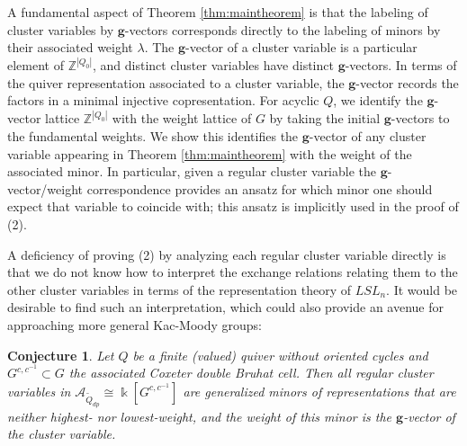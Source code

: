 \documentclass[12pt]{amsart}
\newcommand{\sayDR}[1]{\say[DR]{\color{red}{\bf DR:}\;#1}}
\newcommand{\cA}{\mathcal{A}}
\newcommand{\ZZ}{\mathbb{Z}}
\newcommand{\kk}{\Bbbk}
\newcommand{\bfg}{\mathbf{g}}
\newcommand{\Qdp}{\widetilde{Q}_{dp}}
\newtheorem{conjecture}[theorem]{Conjecture}
\theoremstyle{remark}
\numberwithin{equation}{section}
\numberwithin{figure}{section}
\begin{document}
A fundamental aspect of Theorem \ref{thm:maintheorem} is that the labeling of cluster variables by $\bfg$-vectors corresponds directly to the labeling of minors by their associated weight $\lambda$. 
The $\bfg$-vector of a cluster variable is a particular element of $\ZZ^{|Q_0|}$, and distinct cluster variables have distinct $\bfg$-vectors. In terms of the quiver representation associated to a cluster variable, the $\bfg$-vector records the factors in a minimal injective copresentation. 
For acyclic $Q$, we identify the $\bfg$-vector lattice $\ZZ^{|Q_0|}$ with the weight lattice of $G$ by taking the initial $\bfg$-vectors to the fundamental weights.
We show this identifies the $\bfg$-vector of any cluster variable appearing in Theorem \ref{thm:maintheorem} with the weight of the associated minor. In particular, given a regular cluster variable the $\bfg$-vector/weight correspondence provides an ansatz for which minor one should expect that variable to coincide with; this ansatz is implicitly used in the proof of (2). 

A deficiency of proving (2) by analyzing each regular cluster variable directly is that we do not know how to interpret the exchange relations relating them to the other cluster variables in terms of the representation theory of $LSL_n$. It would be desirable to find such an interpretation, which could also provide an avenue for approaching more general Kac-Moody groups:


\begin{conjecture}\label{conj:mainconjecture}
  Let $Q$ be a finite (valued) quiver without oriented cycles and $G^{c,c^{-1}} \subset G$ the associated Coxeter double Bruhat cell.
  Then all regular cluster variables in  $\cA_{\Qdp} \cong \kk[G^{c,c^{-1}}]$ are generalized minors of representations that are neither highest- nor lowest-weight, and the weight of this minor is the $\bfg$-vector of the cluster variable.
\end{conjecture}
\end{document}
